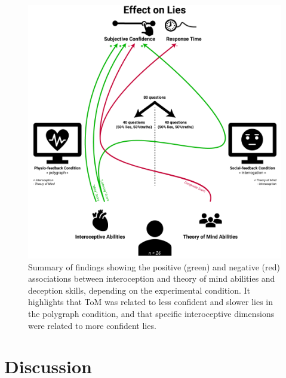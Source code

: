 \documentclass[
  man,mask,floatsintext]{apa6}
\begin{document}
\begin{figure}
\includegraphics[width=1\linewidth]{../figures/figure2} \caption{Summary of findings showing the positive (green) and negative (red) associations between interoception and theory of mind abilities and deception skills, depending on the experimental condition. It highlights that ToM was related to less confident and slower lies in the polygraph condition, and that specific interoceptive dimensions were related to more confident lies.}\label{fig:unnamed-chunk-2}
\end{figure}

\hypertarget{discussion}{%
\section{Discussion}\label{discussion}}
\end{document}

